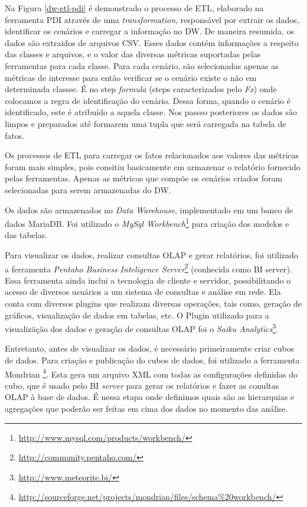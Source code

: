 Na Figura \ref{dw-etl-pdi} é demonstrado o processo de ETL, elaborado na ferramenta PDI através de uma \emph{transformation}, responsável por extrair os dados, identificar os cenários e carregar a informação no DW. De maneira resumida, os dados são extraidos de arquivos CSV. Esses dados contém informações a respeito das classes e arquivos, e o valor das diversas métricas suportadas pelas ferramentas para cada classe. Para cada cenário, são selecionadas apenas as métricas de interesse para então verificar se o cenário existe o não em determinada classse. É no step \emph{formula} (steps caracterizados pelo \emph{Fx}) onde colocamos a regra de identificação do cenário. Dessa forma, quando o cenário é identificado, este é atribuído a aquela classe. Nos passso posteriores os dados são limpos e preparados até formarem uma tupla que será carregada na tabela de fatos.


Os processos de ETL para carregar os fatos relacionados aos valores das métricas foram mais simples, pois consitiu basicamente em armazenar o relatório fornecido pelas ferramentas. Apenas as métricas que compõe os cenários criados foram selecionadas para serem armazenadas do DW.


Os dados são armazenados no \emph{Data Warehouse}, implementado em um banco de dados MariaDB. Foi utilizado o \emph{MySql Workbench}\footnote{\url{http://www.mysql.com/products/workbench/}} para criação dos modelos e das tabelas.


Para visualizar os dados, realizar consultas OLAP e gerar relatórios, foi utilizado a ferramenta \emph{Pentaho Business Inteligence Server}\footnote{\url{http://community.pentaho.com/}} (conhecida como BI server). Essa ferramenta ainda inclui a tecnologia de cliente e servidor, possibilitando o acesso de diversos usuários a um sistema de consultas e análise em rede. Ela conta com diversos plugins que realizam diversas operações, tais como, geração de gráficos, visualização de dados em tabelas, etc. O Plugin utilizado para a visualizãção dos dados e geração de consultas OLAP foi o \emph{Saiku Analytics}\footnote{\url{http://www.meteorite.bi/}}.

Entretanto, antes de visualizar os dados, é necessário primeiramente criar cubos de dados. Para criação e publicação do cubos de dados, foi utilizado a ferramenta Mondrian \footnote{\url{http://sourceforge.net/projects/mondrian/files/schema\%20workbench/}}. Esta gera um arquivo XML com todas as configurações definidas do cubo, que é usado pelo BI \emph{server} para gerar os relatórios e fazer as conultas OLAP à base de dados. É nessa etapa onde definimos quais são as hierarquias e agregações que poderão ser feitas em cima dos dados no momento das análise.



